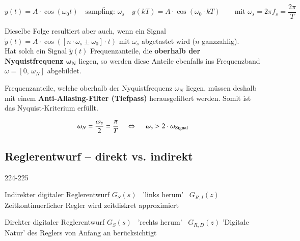 $$ y(t) = A \cdot \cos(\omega_0 t) \quad \underrightarrow{\text{sampling: } \omega_s} \quad y(kT) = A \cdot \cos(\omega_0 \cdot kT) \qquad \text{mit } \omega_s = 2 \pi f_s = \frac{2 \pi}{T} $$

\vspace{-0.2cm}

Dieselbe Folge resultiert aber auch, wenn ein Signal $\tilde{y}(t) = A \cdot \cos\left([n \cdot \omega_s \pm \omega_0] \cdot t \right)$ mit $\omega_s$ abgetastet wird ($n$ ganzzahlig). \\
Hat solch ein Signal $\tilde{y}(t)$ Frequenzanteile, die \textbf{oberhalb der Nyquistfrequenz $\bm{\omega_N}$} liegen, so werden diese
Anteile ebenfalls ins Frequenzband $\omega = [0, \, \omega_N]$ abgebildet. 

\smallskip

Frequenzanteile, welche oberhalb der Nyquistfrequenz $\omega_N$ liegen, müssen deshalb mit einem \textbf{Anti-Aliasing-Filter (Tiefpass)} herausgefiltert werden.
Somit ist das Nyquist-Kriterium erfüllt.

\vspace{-0.2cm}

$$ \omega_N = \frac{\omega_s}{2} = \frac{\pi}{T} \quad \Leftrightarrow\ \quad \omega_s > 2 \cdot \omega_{\rm Signal} $$


\subsection{Reglerentwurf -- direkt vs. indirekt}{224-225}

\begin{minipage}[t]{0.48\columnwidth}
    \raggedright
    \begin{outline}
        \1  Indirekter digitaler Reglerentwurf
            \2 $G_S(s)$ \textrightarrow\ 'links herum' \textrightarrow\ $G_{R,I}(z)$
            \2 Zeitkontinuerlicher Regler wird zeitdiskret approximiert
    \end{outline}
\end{minipage}
\hfill
\begin{minipage}[t]{0.48\columnwidth}
    \raggedright
    \begin{outline}
        \1 Direkter digitaler Reglerentwurf
            \2 $G_S(s)$ \textrightarrow\ 'rechts herum' \textrightarrow\ $G_{R,D}(z)$
            \2 'Digitale Natur' des Reglers von Anfang an berücksichtigt
    \end{outline}
\end{minipage}


